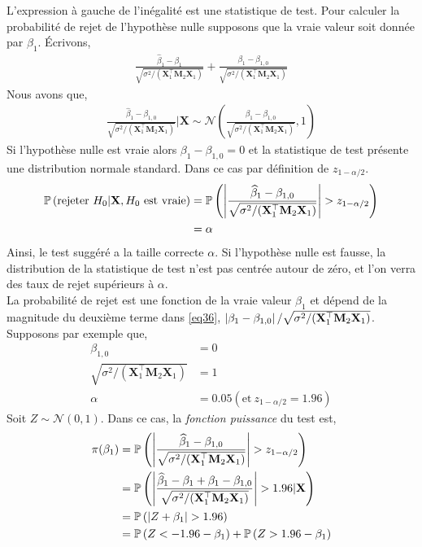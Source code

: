 L'expression à gauche de l'inégalité est une statistique de test. Pour calculer la probabilité de rejet de l'hypothèse nulle supposons que la vraie valeur soit donnée par $\beta_1$. \'Ecrivons, 
\begin{align}
\frac{\widehat{\beta}_1 - \beta_1}{ \sqrt{\sigma^2/(\mathbf{X}_1^\top\mathbf{M}_2\mathbf{X}_1)}} + 
\frac{\beta_1 - \beta_{1,0}}{ \sqrt{\sigma^2/(\mathbf{X}_1^\top\mathbf{M}_2\mathbf{X}_1)}} 
\label{eq36}
\end{align}
Nous avons que,
\begin{align*}
\frac{\widehat{\beta}_1 - \beta_{1,0}}{ \sqrt{\sigma^2/(\mathbf{X}_1^\top\mathbf{M}_2\mathbf{X}_1)}} | \mathbf{X}
 \sim
 \mathcal{N}\left( \frac{\beta_1 - \beta_{1,0}}{ \sqrt{\sigma^2/(\mathbf{X}_1^\top\mathbf{M}_2\mathbf{X}_1)}}, 1 \right) 
\end{align*}
Si l'hypothèse nulle est vraie alors $\beta_1-\beta_{1,0} = 0$ et la statistique de test présente une distribution normale standard. Dans ce cas par définition de $z_{1-\alpha/2}$.
\begin{align*}
{\mathbb{P}}\left(\textrm{rejeter} \ H_0 | \mathbf{X}, H_0 \ \textrm{est vraie}\right) &= 
{\mathbb{P}}\left(\left\vert {\frac{\widehat{\beta}_1 - \beta_{1,0}}{ \sqrt{\sigma^2/(\mathbf{X}_1^\top\mathbf{M}_2\mathbf{X}_1)}}} \right\vert > z_{1-\alpha/2}\right)\\
&= \alpha
\end{align*}
Ainsi, le test suggéré a la taille correcte $\alpha$. Si l'hypothèse nulle est fausse, la distribution de la statistique de test n'est pas centrée autour de zéro, et l'on verra des taux de rejet supérieurs à $\alpha$.\\
La probabilité de rejet est une fonction de la vraie valeur $\beta_1$ et dépend de la magnitude du deuxième terme dans \eqref{eq36}, $\left\vert {\beta_1 - \beta_{1,0}} \right\vert/ \sqrt{\sigma^2/(\mathbf{X}_1^\top\mathbf{M}_2\mathbf{X}_1)}$. Supposons par exemple que,
\begin{align*}
\beta_{1,0} &= 0\\
 \sqrt{\sigma^2/(\mathbf{X}_1^\top\mathbf{M}_2\mathbf{X}_1)} &=1\\
 \alpha &=0.05(\textrm{et} \ z_{1-\alpha/2} = 1.96) 
\end{align*}
Soit $Z \sim \mathcal{N}(0,1)$. Dans ce cas, la \emph{fonction puissance} du test est,
\begin{align*}
\pi(\beta_1) &= {\mathbb{P}}\left( \left\vert {\frac{\widehat{\beta}_1 - \beta_{1,0}}{ \sqrt{\sigma^2/(\mathbf{X}_1^\top\mathbf{M}_2\mathbf{X}_1)}}} \right\vert > z_{1-\alpha/2} \right)\\
&= {\mathbb{P}}\left( \left\vert {\frac{\widehat{\beta}_1 - \beta_1+\beta_1 -\beta_{1,0}}{ \sqrt{\sigma^2/(\mathbf{X}_1^\top\mathbf{M}_2\mathbf{X}_1)}}} \right\vert > 1.96 | \mathbf{X} \right)\\
&={\mathbb{P}}\left(\left\vert {Z + \beta_1} \right\vert > 1.96\right)\\
&= {\mathbb{P}}\left( Z < -1.96 - \beta_1\right)+ {\mathbb{P}}\left( Z > 1.96 - \beta_1\right)
\end{align*}
